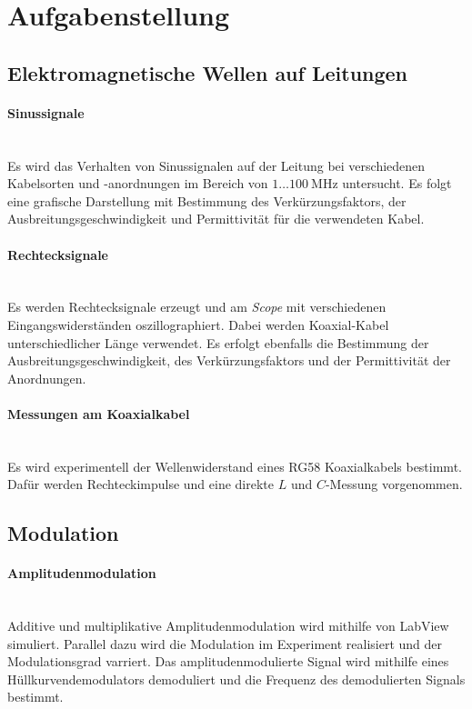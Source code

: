 \documentclass[a4paper,twoside,final]{article}
\begin{document}
\section{Aufgabenstellung} \label{sec:Aufgabenstellung}
\subsection{Elektromagnetische Wellen auf Leitungen}
\paragraph{Sinussignale}$~$\\
Es wird das Verhalten von Sinussignalen auf der Leitung bei verschiedenen Kabelsorten und -anordnungen im Bereich von $1\hdots\SI{100}{\mega\hertz}$ untersucht. Es folgt eine grafische Darstellung mit Bestimmung des Verkürzungsfaktors, der Ausbreitungsgeschwindigkeit und Permittivität für die verwendeten Kabel.
\paragraph{Rechtecksignale}$~$\\
Es werden Rechtecksignale erzeugt und am \textit{Scope} mit verschiedenen Eingangswiderständen oszillographiert. Dabei werden Koaxial-Kabel unterschiedlicher Länge verwendet. Es erfolgt ebenfalls die Bestimmung der Ausbreitungsgeschwindigkeit, des Verkürzungsfaktors und der Permittivität der Anordnungen.
\paragraph{Messungen am Koaxialkabel}$~$\\
Es wird experimentell der Wellenwiderstand eines RG58 Koaxialkabels bestimmt. Dafür werden Rechteckimpulse und eine direkte $L$ und $C$-Messung vorgenommen.

\subsection{Modulation}
\paragraph{Amplitudenmodulation}$~$\\
Additive und multiplikative Amplitudenmodulation wird mithilfe von LabView simuliert. Parallel dazu wird die Modulation im Experiment realisiert und der Modulationsgrad varriert. Das amplitudenmodulierte Signal wird mithilfe eines Hüllkurvendemodulators demoduliert und die Frequenz des demodulierten Signals bestimmt.
\end{document}
